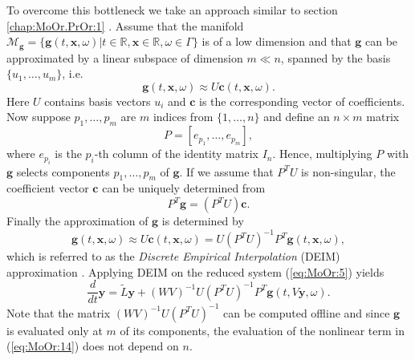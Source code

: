 {\edit To overcome this bottleneck we take an approach similar to section \ref{chap:MoOr.PrOr:1} \cite{Chaturantabut:2010cz,Barrault:2004kz}}. Assume that the manifold $\mathcal M_{\mathbf g} = \{ \mathbf g(t,\mathbf x , \omega)| t\in \mathbb R, \mathbf x \in \mathbb R , \omega \in \Gamma\}$ is of a low dimension and that $\mathbf g$ can be approximated by a linear subspace of dimension $m\ll n$, spanned by the basis $\{ u_1 , \dots , u_m \}$, i.e.
\begin{equation} \label{eq:MoOr:10}
	\mathbf g(t,\mathbf x,\omega) \approx U \mathbf c(t,\mathbf x,\omega).
\end{equation}
Here $U$ contains basis vectors $u_i$ and $\mathbf c$ is the corresponding vector of coefficients. Now suppose $p_1,\dots,p_m$ are $m$ indices from $\{1,\dots,n\}$ and define an $n\times m$ matrix
\begin{equation} \label{eq:MoOr:11}
	P = [e_{p_1},\dots,e_{p_m}],
\end{equation}
where $e_{p_i}$ is the $p_i$-th column of the identity matrix $I_n$. Hence, multiplying $P$ with $\mathbf g$ selects components $p_1,\dots,p_m$ of $\mathbf g$. If we assume that $P^TU$ is non-singular, the coefficient vector $\mathbf c$ can be uniquely determined from
\begin{equation} \label{eq:MoOr:12}
	P^T \mathbf g = (P^TU)\mathbf c.
\end{equation}
Finally the approximation of $\mathbf g$ is determined by
\begin{equation} \label{eq:MoOr:13}
	\mathbf g(t,\mathbf x,\omega) \approx U \mathbf c(t,\mathbf x,\omega) = U (P^TU)^{-1} P^T \mathbf g(t,\mathbf x,\omega),
\end{equation}
which is referred to as the \emph{Discrete Empirical Interpolation} (DEIM) approximation \cite{Chaturantabut:2010cz}. Applying DEIM on the reduced system (\ref{eq:MoOr:5}) yields
\begin{equation} \label{eq:MoOr:14}
	\frac{d}{dt} \mathbf y = \tilde L \mathbf y + (WV)^{-1} U(P^TU)^{-1}P^T \mathbf g(t,V\mathbf y , \omega).
\end{equation}
Note that the matrix $(WV)^{-1} U(P^TU)^{-1}$ can be computed offline and since $\mathbf g$ is evaluated only at $m$ of its components, the evaluation of the nonlinear term in (\ref{eq:MoOr:14}) does not depend on $n$.

